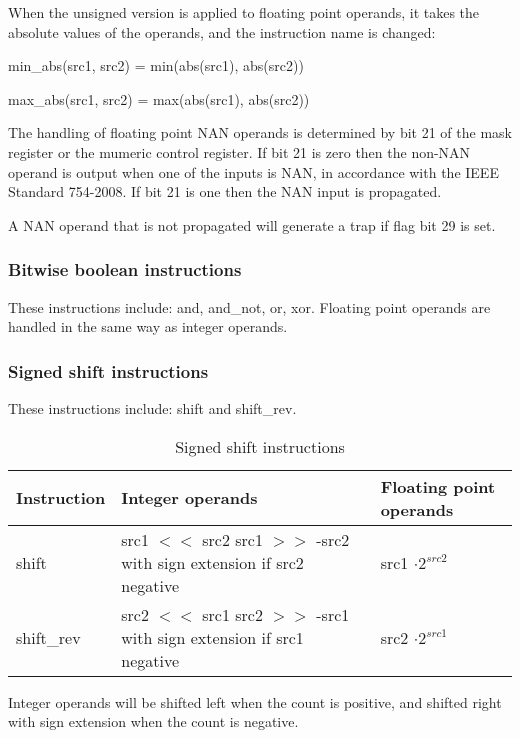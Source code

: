 \documentclass[forwardcom.tex]{subfiles}
\begin{document}
When the unsigned version is applied to floating point operands, it takes the absolute values of the operands, and the instruction name is changed:
\vspace{2mm}

min\_abs(src1, src2) = min(abs(src1), abs(src2))

max\_abs(src1, src2) = max(abs(src1), abs(src2))
\vspace{2mm}

The handling of floating point NAN operands is determined by bit 21 of the mask register or the mumeric control register. If bit 21 is zero then the non-NAN operand is output when one of the inputs is NAN, in accordance with the IEEE Standard 754-2008. If bit 21 is one then the NAN input is propagated.
\vspace{2mm}

A NAN operand that is not propagated will generate a trap if flag bit 29 is set.

\subsubsection{Bitwise boolean instructions}
These instructions include: and, and\_not, or, xor. Floating point operands are handled in the same way as integer operands.

\subsubsection{Signed shift instructions}
These instructions include: shift and shift\_rev.

\begin{longtable} {|p{20mm}|p{60mm}|p{50mm}|}
\caption{Signed shift instructions} 
\label{table:SignedShiftInstructions} \\
\endfirsthead
\endhead
\hline
\bfseries Instruction & \bfseries Integer operands & \bfseries Floating point operands   \\
\hline
shift      & src1 $<<$ src2 \newline src1 $>>$ -src2 with sign extension if src2 negative &
  src1 $ \cdot 2^{src2} $ \\
\hline
shift\_rev & src2 $<<$ src1 \newline src2 $>>$ -src1 with sign extension if src1 negative & src2 $ \cdot 2^{src1} $ \\
\hline
\end{longtable}

Integer operands will be shifted left when the count is positive, and shifted right with
sign extension when the count is negative.
\vspace{2mm}
\end{document}

